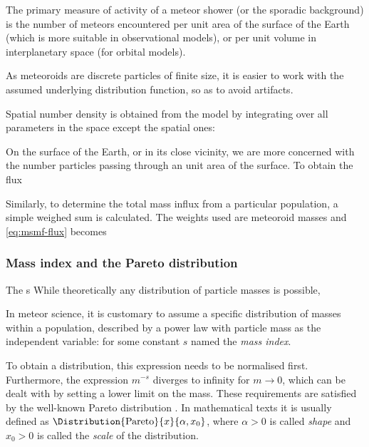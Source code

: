             The primary measure of activity of a meteor shower (or the sporadic background) is the number
            of meteors encountered per unit area of the surface of the Earth (which is more suitable
            in observational models), or per unit volume in interplanetary space (for orbital models).

            As meteoroids are discrete particles of finite size, it is easier to work with the
            assumed underlying distribution function, so as to avoid artifacts.

            Spatial number density is obtained from the model by integrating over all parameters
            in the space except the spatial ones:

            On the surface of the Earth, or in its close vicinity, we are more concerned with
            the number particles passing through an unit area of the surface.
            To obtain the flux

            Similarly, to determine the total mass influx from a particular population, a simple weighed sum is calculated.
            The weights used are meteoroid masses and \cref{eq:msmf-flux} becomes

        \subsubsection{Mass index and the Pareto distribution} \label{msms}
            The s
            While theoretically any distribution of particle masses is possible,

            In meteor science, it is customary to assume a specific distribution of masses within a population,
            described by a power law with particle mass as the independent variable:
            for some constant $s$ named the \emph{mass index}.

            To obtain a distribution, this expression needs to be normalised first.
            Furthermore, the expression $m^{-s}$ diverges to infinity for $m \to 0$,
            which can be dealt with by setting a lower limit on the mass.
            These requirements are satisfied by the well-known Pareto distribution \citep{arnold1983}.
            In mathematical texts it is usually defined as $\Distribution{\mathrm{Pareto}}{x}{\alpha, x_0}$,
            where $\alpha > 0$ is called \emph{shape} and $x_0 > 0$ is called the \emph{scale} of the distribution.

